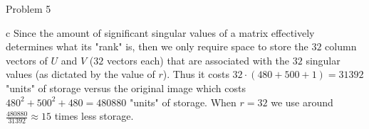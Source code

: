 \begin{section}{Problem 5}
    \begin{solution}{c}
        Since the amount of significant singular values of a matrix effectively determines what its "rank" is, then we only require space to store the $32$ column vectors of $U$ and $V$ ($32$ vectors each) that are associated with the $32$ singular values (as dictated by the value of $r$). Thus it costs $32 \cdot (480 + 500 + 1) = 31392$ "units" of storage versus the original image which costs $480^2 + 500^2 + 480 = 480880$ "units" of storage. When $r = 32$ we use around $\frac{480880}{31392} \approx 15$ times less storage.
    \end{solution}
\end{section}